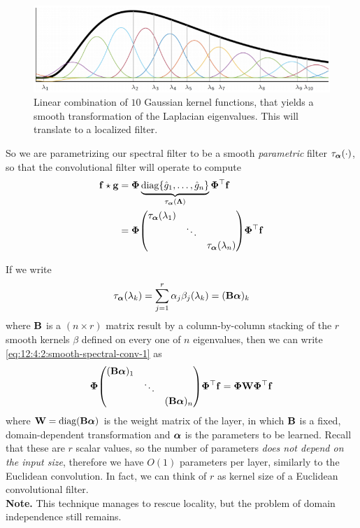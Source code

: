 \begin{figure}[H]
    \centering
    \includegraphics[width=.7\textwidth]{figures/12/40_46.png}
    \caption{Linear combination of $10$ Gaussian kernel functions, that yields a smooth transformation of the Laplacian eigenvalues. This will translate to a localized filter.}
\end{figure}

So we are parametrizing our spectral filter to be a smooth \emph{parametric} filter $\tau_{\vb*{\alpha}}(\cdot)$, so that the convolutional filter will operate to compute
\begin{equation}
    \begin{aligned}
        \vb{f} \star \vb{g} & = \vb*{\Phi} \underbrace{\mathrm{diag} \{ \hat{g}_1, \dots, \hat{g}_n \}}_{\tau_{\vb*{\alpha}}(\vb*{\Lambda})} \vb*{\Phi}^{\top} \vb{f}  \\
        & = \vb*{\Phi} \mqty(
            \tau_{\vb*{\alpha}}(\lambda_1) & & \\
            & \ddots & \\
            & & \tau_{\vb*{\alpha}}(\lambda_n)
        ) \vb*{\Phi}^{\top} \vb{f}
    \end{aligned}
    \label{eq:12:4:2:smooth-spectral-conv-1}
\end{equation}

If we write
\begin{equation}
    \tau_{\vb*{\alpha}}(\lambda_k) = \sum_{j = 1}^{r} \alpha_j \beta_j (\lambda_k) = (\vb{B} \vb*{\alpha})_k
\end{equation}
where $\vb{B}$ is a $(n \times r)$ matrix result by a column-by-column stacking of the $r$ smooth kernels $\beta$ defined on every one of $n$ eigenvalues, then we can write \cref{eq:12:4:2:smooth-spectral-conv-1} as 
\begin{equation}
    \vb*{\Phi} \mqty(
            (\vb{B} \vb*{\alpha})_1 & & \\
            & \ddots & \\
            & & (\vb{B} \vb*{\alpha})_n
        ) \vb*{\Phi}^{\top} \vb{f} = \vb*{\Phi} \vb{W} \vb*{\Phi}^{\top} \vb{f}
\end{equation}
where $\vb{W} = \mathrm{diag}(\vb{B} \vb*{\alpha})$ is the weight matrix of the layer, in which $\vb{B}$ is a fixed, domain-dependent transformation and $\vb*{\alpha}$ is the parameters to be learned. Recall that these are $r$ scalar values, so the number of parameters \emph{does not depend on the input size}, therefore we have $O(1)$ parameters per layer, similarly to the Euclidean convolution. In fact, we can think of $r$ as kernel size of a Euclidean convolutional filter. 
\\

\textbf{Note.} This technique manages to rescue locality, but the problem of domain independence still remains.